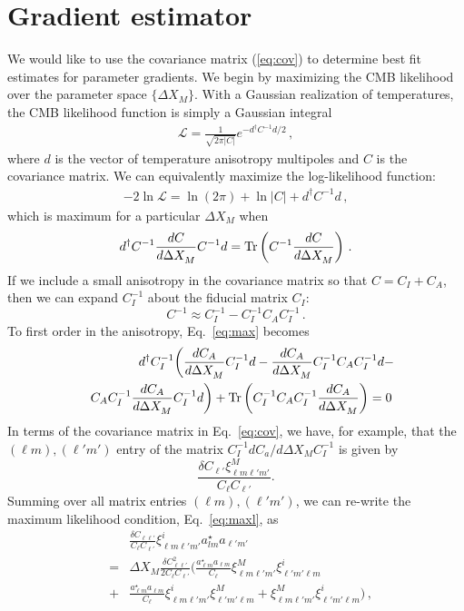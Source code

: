 \documentclass[twocolumn,aps,prd,showpacs]{revtex4}
\def\beq{\begin{equation}}
\def\eeq{\end{equation}}
\begin{document}
\section{Gradient estimator}
\label{sec:grad est}
We would like to use the covariance matrix (\ref{eq:cov}) to determine best 
fit estimates for parameter gradients. We begin by maximizing the CMB 
likelihood over the parameter space $\{\Delta X_M\}$. With a Gaussian 
realization of temperatures, the CMB likelihood function is simply a 
Gaussian integral
\begin{eqnarray}
\mathcal{L}=\frac{1}{\sqrt{2\pi|C|}}e^{-d^\dagger C^{-1}d/2}\, ,
\end{eqnarray}
where $d$ is the vector of temperature anisotropy multipoles and $C$ is the 
covariance matrix.  We can equivalently maximize the log-likelihood function:
\begin{eqnarray}
- 2 \ln \mathcal{L} = \ln(2\pi) + \ln |C| + d^{\dagger} C^{-1} d\, ,
\end{eqnarray}
which is maximum for a particular $\Delta X_M$ when
\beq\label{eq:max}
d^{\dagger} C^{-1} \frac{d C}{d \Delta X_M^{}} C^{-1}  d
   = {\rm Tr} \left(C^{-1} \frac{d C}{d \Delta X_M^{}}  \right)\,.
\eeq
If we include a small anisotropy in the covariance matrix so that $C=C_I+C_A$, 
then we can expand $C_I^{-1}$ about the fiducial matrix $C_I$:
\beq
C^{-1} \approx C^{-1}_I - C_{I}^{-1} C_A C_I^{-1}\, .
\eeq
To first order in the anisotropy, Eq.~\eqref{eq:max} becomes
\begin{eqnarray}\label{eq:maxl}
&&d^{\dagger} C_I^{-1}\bigg( \frac{d C_A}{d \Delta X_M^{}} C_I^{-1}  d 
-  \frac{d C_A}{d\Delta X_M^{}} C_I^{-1}  C_A C_I^{-1}  d  - \\
&&C_A C_I^{-1} \frac{d C_A}{d \Delta X_M^{}} C_I^{-1}  d\bigg) 
+  {\rm Tr} \left( C_{I}^{-1} C_A C_I^{-1} \frac{d C_A}{d \Delta X_M^{}}\right)
 = 0\,    \nonumber
\end{eqnarray}
In terms of the covariance matrix in Eq.~\eqref{eq:cov}, we have, for 
example, that the $(\ell m),(\ell' m')$ entry of the matrix 
$C_I^{-1}dC_a/d\Delta X_M C_I^{-1}$ is given by
\beq
\frac{\delta C_{\ell'}\xi^M_{\ell m \ell 'm'}}{C_\ell C_{\ell'}}.
\eeq
Summing over all matrix entries $(\ell m),(\ell 'm')$, we can re-write the 
maximum likelihood condition, Eq.~\eqref{eq:maxl}, as
\begin{eqnarray}
&&\frac{\delta C_{\ell \ell'}}{C_{\ell} C_{\ell'}}\xi^i_{\ell m \ell' m'}
 a_{lm}^{\star} a_{\ell' m'}\nonumber \\
 &=&   \Delta X^{}_{M}  \frac{ \delta C_{\ell \ell'}^2 }{2 C_{\ell} C_{\ell'}} 
\bigg( \frac{a_{\ell m}^{\star} a_{\ell m}}{C_{\ell}} \xi^M_{\ell m \ell' m'} 
\xi^i_{\ell' m' \ell m} \nonumber \\
 &+&  \frac{a_{\ell m}^{\star} a_{\ell m}}{C_{\ell}} \xi^i_{\ell m \ell' m'} 
\xi^M_{\ell' m' \ell m} + \xi^M_{\ell m \ell' m'} \xi^i_{\ell' m' \ell m}\bigg)\, ,
\end{eqnarray}
\end{document}
